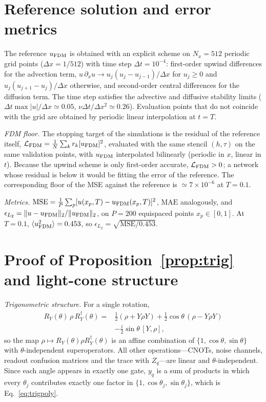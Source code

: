 \documentclass[floatfix,aps,pra,twocolumn,superscriptaddress,10pt,nofootinbib]{revtex4-2}
\begin{document}
\begin{appendices}

\section{Reference solution and error metrics}\label{app:reference}
The reference $u_{\rm FDM}$ is obtained with an explicit scheme on $N_x=512$ periodic grid points ($\Delta x=1/512$) with time step $\Delta t=10^{-4}$: first-order upwind differences for the advection term, $u\,\partial_xu\to u_j(u_j-u_{j-1})/\Delta x$ for $u_j\ge0$ and $u_j(u_{j+1}-u_j)/\Delta x$ otherwise, and second-order central differences for the diffusion term. The time step satisfies the advective and diffusive stability limits ($\Delta t\max|u|/\Delta x\simeq0.05$, $\nu\Delta t/\Delta x^2\simeq0.26$). Evaluation points that do not coincide with the grid are obtained by periodic linear interpolation at $t=T$.

\emph{FDM floor.} The stopping target of the simulations is the residual of the reference itself, $\mathcal L_{\rm FDM}=\frac{1}{N}\sum_k r_k[u_{\rm FDM}]^2$, evaluated with the same stencil $(h,\tau)$ on the same validation points, with $u_{\rm FDM}$ interpolated bilinearly (periodic in $x$, linear in $t$). Because the upwind scheme is only first-order accurate, $\mathcal L_{\rm FDM}>0$; a network whose residual is below it would be fitting the error of the reference. The corresponding floor of the MSE against the reference is $\simeq7\times10^{-6}$ at $T=0.1$.

\emph{Metrics.} $\mathrm{MSE}=\frac1P\sum_p[u(x_p,T)-u_{\rm FDM}(x_p,T)]^2$, $\mathrm{MAE}$ analogously, and $\epsilon_{L_2}=\|u-u_{\rm FDM}\|_2/\|u_{\rm FDM}\|_2$, on $P=200$ equispaced points $x_p\in[0,1]$. At $T=0.1$, $\langle u_{\rm FDM}^2\rangle=0.453$, so $\epsilon_{L_2}=\sqrt{\mathrm{MSE}/0.453}$.

\section{Proof of Proposition~\ref{prop:trig} and light-cone structure}\label{app:trig}
\emph{Trigonometric structure.} For a single rotation,
\begin{align}
  R_Y(\theta)\,\rho\,R_Y^\dagger(\theta)={}&\tfrac12(\rho+Y\rho Y)+\tfrac12\cos\theta\,(\rho-Y\rho Y)\nonumber\\
  &-\tfrac{i}{2}\sin\theta\,[Y,\rho],
  \label{eq:ry_channel}
\end{align}
so the map $\rho\mapsto R_Y(\theta)\rho R_Y^\dagger(\theta)$ is an affine combination of $\{1,\cos\theta,\sin\theta\}$ with $\theta$-independent superoperators. All other operations---CNOTs, noise channels, readout confusion matrices and the trace with $Z_q$---are linear and $\theta$-independent. Since each angle appears in exactly one gate, $y_q$ is a sum of products in which every $\theta_j$ contributes exactly one factor in $\{1,\cos\theta_j,\sin\theta_j\}$, which is Eq.~\eqref{eq:trigpoly}.


\end{appendices}
\end{document}
